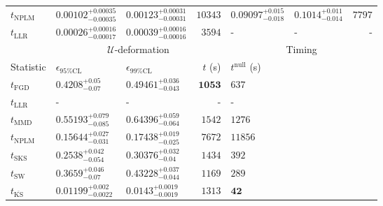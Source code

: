 \begin{tabular}{l|llr|llr}
\rowcolor{red!35}	$t_{\mathrm{NPLM}}$ & $0.00102_{-0.00035}^{+0.00035}$ & $0.00123_{-0.00031}^{+0.00031}$ & $10343$ & $0.09097_{-0.018}^{+0.015}$ & $0.1014_{-0.014}^{+0.011}$ & $7797$ \\
	$t_{\mathrm{LLR}}$ & $0.00026_{-0.00017}^{+0.00016}$ & $0.00039_{-0.00016}^{+0.00016}$ & $3594$ & - & - & - \\
	\toprule
	\multicolumn{1}{c}{} & \multicolumn{3}{c}{$\mathcal{U}$-deformation} & \multicolumn{3}{c}{Timing} \\
	Statistic & $\epsilon_{95\%\mathrm{CL}}$ & $\epsilon_{99\%\mathrm{CL}}$ & $t$ (s) & $t^{\mathrm{null}}$ (s) \\
	\midrule
	$t_{\mathrm{FGD}}$ & $0.4208_{-0.07}^{+0.05}$ & $0.49461_{-0.043}^{+0.036}$ & ${\mathbf{1053}}$ & $637$ \\
	$t_{\mathrm{LLR}}$ & - & - & - & - \\
	$t_{\mathrm{MMD}}$ & $0.55193_{-0.085}^{+0.079}$ & $0.64396_{-0.064}^{+0.059}$ & $1542$ & $1276$ \\
\rowcolor{red!35}	$t_{\mathrm{NPLM}}$ & $0.15644_{-0.031}^{+0.027}$ & $0.17438_{-0.025}^{+0.019}$ & $7672$ & $11856$ \\
	$t_{\mathrm{SKS}}$ & $0.2538_{-0.054}^{+0.042}$ & $0.30376_{-0.04}^{+0.032}$ & $1434$ & $392$ \\
	$t_{\mathrm{SW}}$ & $0.3659_{-0.07}^{+0.046}$ & $0.43228_{-0.044}^{+0.037}$ & $1169$ & $289$ \\
	$t_{\overline{\mathrm{KS}}}$ & ${\mathbf{0.01199_{-0.0022}^{+0.002}}}$ & ${\mathbf{0.0143_{-0.0019}^{+0.0019}}}$ & $1313$ & ${\mathbf{42}}$ \\
	\bottomrule
\end{tabular}